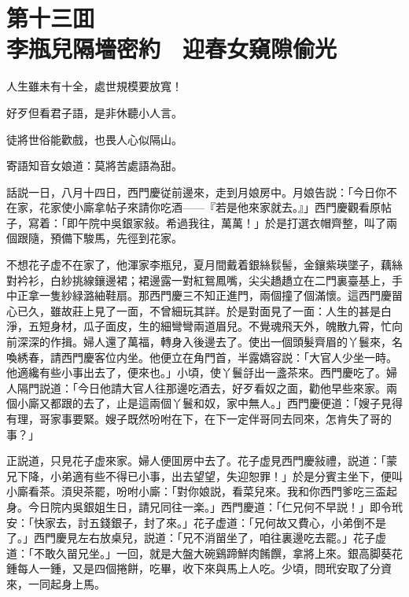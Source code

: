 
\chapter*{第十三囬　\\李瓶兒隔墻密約　迎春女窺隙偷光}


\begin{myquote}
人生雖未有十全，處世規模要放寬！

好歹但看君子語，是非休聽小人言。

徒將世俗能歡戲，也畏人心似隔山。

寄語知音女娘道：莫將苦處語為甜。
\end{myquote}

話説一日，八月十四日，西門慶従前邊來，走到月娘房中。月娘告説：「今日你不在家，花家使小廝拿帖子來請你吃酒——『若是他來家就去。』」西門慶觀看原帖子，寫着：「即午院中吳銀家敍。希過我往，萬萬！」於是打選衣帽齊整，叫了兩個跟隨，預備下駿馬，先徑到花家。

不想花子虚不在家了，他渾家李瓶兒，夏月間戴着銀絲䯼髻，金鑲紫瑛墜子，藕絲對衿衫，白紗挑線鑲邊裙；裙邊露一對紅鴛鳳嘴，尖尖趫趫立在二門裏臺基上，手中正拿一隻紗緑潞紬鞋扇。那西門慶三不知正進門，兩個撞了個滿懷。這西門慶㽞心已久，雖故莊上見了一面，不曾細玩其詳。於是對面見了一面：人生的甚是白淨，五短身材，瓜子面皮，生的細彎彎兩道眉兒。不覺魂飛天外，魄散九霄，忙向前深深的作揖。婦人還了萬福，轉身入後邊去了。使出一個頭髮齊眉的丫鬟來，名喚綉春，請西門慶客位内坐。他便立在角門首，半露嬌容説：「大官人少坐一時。他適纔有些小事出去了，便來也。」小頃，使丫鬟㧱出一盞茶來。西門慶吃了。婦人隔門説道：「今日他請大官人往那邊吃酒去，好歹看奴之面，勸他早些來家。兩個小廝又都跟的去了，止是這兩個丫鬟和奴，家中無人。」西門慶便道：「嫂子見得有理，哥家事要緊。嫂子既然吩咐在下，在下一定伴哥同去同來，怎肯失了哥的事？」

正説道，只見花子虚來家。婦人便囬房中去了。花子虚見西門慶敍禮，説道：「蒙兄下降，小弟適有些不得已小事，出去望望，失迎恕罪！」於是分賓主坐下，便叫小廝看茶。湏臾茶罷，吩咐小廝：「對你娘説，看菜兒來。我和你西門爹吃三盃起身。今日院内吳銀姐生日，請兄同往一楽。」西門慶道：「仁兄何不早説！」即令玳安：「快家去，討五錢銀子，封了來。」花子虚道：「兄何故又費心，小弟倒不是了。」西門慶見左右放桌兒，説道：「兄不消㽞坐了，咱往裏邊吃去罷。」花子虚道：「不敢久㽞兄坐。」一回，就是大盤大碗鷄蹄鮮肉餚饌，拿將上來。銀高脚葵花鍾每人一鍾，又是四個捲餅，吃畢，收下來與馬上人吃。少頃，問玳安取了分資來，一同起身上馬。

